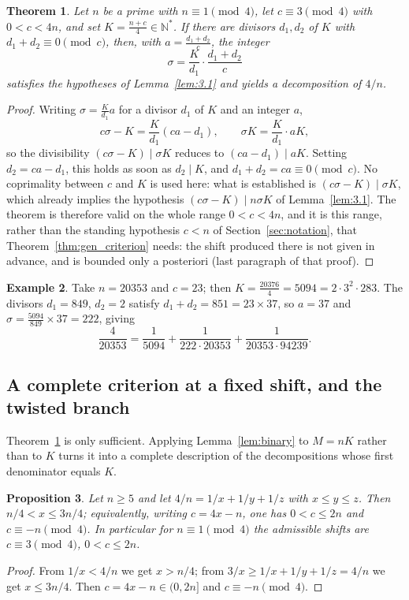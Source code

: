\documentclass[11pt, a4paper]{article}
\theoremstyle{plain}
\newtheorem{theorem}{Theorem}[section]
\newtheorem{proposition}[theorem]{Proposition}
\theoremstyle{definition}
\newtheorem{example}[theorem]{Example}
\newcommand{\N}{\mathbb{N}}
\begin{document}
\begin{theorem}\label{thm:3.3}
Let $n$ be a prime with $n\equiv1\pmod4$, let $c \equiv 3 \pmod{4}$ with $0<c<4n$, and set $K = \frac{n+c}{4}\in\N^{*}$. If there are divisors $d_1, d_2$ of $K$ with $d_1 + d_2 \equiv 0 \pmod{c}$, then, with $a = \frac{d_1 + d_2}{c}$, the integer
$$ \sigma = \frac{K}{d_1} \cdot \frac{d_1 + d_2}{c} $$
satisfies the hypotheses of Lemma~\ref{lem:3.1} and yields a decomposition of $4/n$.
\end{theorem}
\begin{proof}
Writing $\sigma = \frac{K}{d_1}a$ for a divisor $d_1$ of $K$ and an integer $a$,
$$ c\sigma - K = \frac{K}{d_1}(ca - d_1), \qquad \sigma K = \frac{K}{d_1} \cdot aK, $$
so the divisibility $(c\sigma-K)\mid\sigma K$ reduces to $(ca - d_1) \mid aK$. Setting $d_2 = ca - d_1$, this holds as soon as $d_2 \mid K$, and $d_1 + d_2 = ca \equiv 0 \pmod{c}$. No coprimality between $c$ and $K$ is used here: what is established is $(c\sigma-K)\mid\sigma K$, which already implies the hypothesis $(c\sigma-K)\mid n\sigma K$ of Lemma~\ref{lem:3.1}. The theorem is therefore valid on the whole range $0<c<4n$, and it is this range, rather than the standing hypothesis $c<n$ of Section~\ref{sec:notation}, that Theorem~\ref{thm:gen_criterion} needs: the shift produced there is not given in advance, and is bounded only a posteriori (last paragraph of that proof).
\end{proof}

\begin{example} \label{ex:3.4}
Take $n = 20353$ and $c = 23$; then $K = \frac{20376}{4} = 5094 = 2\cdot 3^{2}\cdot 283$. The divisors $d_1 = 849$, $d_2 = 2$ satisfy $d_1 + d_2 = 851 = 23 \times 37$, so $a = 37$ and $\sigma = \frac{5094}{849} \times 37 = 222$, giving
$$ \frac{4}{20353} = \frac{1}{5094} + \frac{1}{222 \cdot 20353} + \frac{1}{20353\cdot 94239}. $$
\end{example}

\subsection{A complete criterion at a fixed shift, and the twisted branch}\label{sec:3.2bis}

Theorem~\ref{thm:3.3} is only sufficient. Applying Lemma~\ref{lem:binary} to $M=nK$ rather than to $K$ turns it into a complete description of the decompositions whose first denominator equals $K$.

\begin{proposition}\label{prop:c_range}
Let $n\ge5$ and let $4/n=1/x+1/y+1/z$ with $x\le y\le z$. Then $n/4<x\le 3n/4$; equivalently, writing $c=4x-n$, one has $0<c\le 2n$ and $c\equiv-n\pmod 4$. In particular for $n\equiv1\pmod4$ the admissible shifts are $c\equiv3\pmod4$, $0<c\le2n$.
\end{proposition}
\begin{proof}
From $1/x<4/n$ we get $x>n/4$; from $3/x\ge 1/x+1/y+1/z=4/n$ we get $x\le3n/4$. Then $c=4x-n\in(0,2n]$ and $c\equiv-n\pmod4$.
\end{proof}
\end{document}
